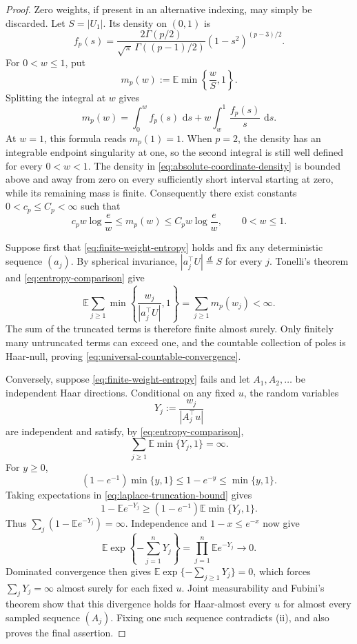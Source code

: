 \documentclass[11pt]{article}
\numberwithin{equation}{section}
\theoremstyle{thmstyleone}%
\theoremstyle{thmstyletwo}%
\let\cref\autoref
\newcommand{\E}{\mathbb E}
\newcommand{\dd}{\,\mathrm d}
\begin{document}
\begin{proof}
Zero weights, if present in an alternative indexing, may simply be
discarded.
Let \(S=|U_1|\).  Its density on \((0,1)\) is
\begin{equation}
  f_p(s)
  =
  \frac{2\Gamma(p/2)}{
    \sqrt\pi\,\Gamma((p-1)/2)}
  (1-s^2)^{(p-3)/2}.
  \label{eq:absolute-coordinate-density}
\end{equation}
For \(0<w\leq1\), put
\[
  m_p(w):=\E\min\left\{\frac{w}{S},1\right\}.
\]
Splitting the integral at \(w\) gives
\begin{equation}
  m_p(w)
  =
  \int_0^w f_p(s)\,\dd s
  +w\int_w^1\frac{f_p(s)}s\,\dd s.
  \label{eq:truncated-reciprocal-moment}
\end{equation}
At \(w=1\), this formula reads \(m_p(1)=1\).  When \(p=2\), the density has
an integrable endpoint singularity at one, so the second integral is still
well defined for every \(0<w<1\).
The density in \cref{eq:absolute-coordinate-density} is bounded above and
away from zero on every sufficiently short interval starting at zero, while
its remaining mass is finite.  Consequently there exist constants
\(0<c_p\leq C_p<\infty\) such that
\begin{equation}
  c_pw\log\frac{e}{w}
  \leq m_p(w)\leq
  C_pw\log\frac{e}{w},
  \qquad 0<w\leq1.
  \label{eq:entropy-comparison}
\end{equation}

Suppose first that \cref{eq:finite-weight-entropy} holds and fix any
deterministic sequence \((a_j)\).  By spherical invariance,
\(|a_j^\top U|\overset{d}{=}S\) for every \(j\).  Tonelli's theorem and
\cref{eq:entropy-comparison} give
\[
  \E\sum_{j\geq1}
  \min\left\{\frac{w_j}{|a_j^\top U|},1\right\}
  =\sum_{j\geq1}m_p(w_j)<\infty.
\]
The sum of the truncated terms is therefore finite almost surely.  Only
finitely many untruncated terms can exceed one, and the countable collection
of poles is Haar-null, proving
\cref{eq:universal-countable-convergence}.

Conversely, suppose \cref{eq:finite-weight-entropy} fails and let
\(A_1,A_2,\ldots\) be independent Haar directions.  Conditional on any
fixed \(u\), the random variables
\[
  Y_j:=\frac{w_j}{|A_j^\top u|}
\]
are independent and satisfy, by \cref{eq:entropy-comparison},
\[
  \sum_{j\geq1}\E\min\{Y_j,1\}=\infty.
\]
For \(y\geq0\),
\begin{equation}
  (1-e^{-1})\min\{y,1\}
  \leq1-e^{-y}\leq\min\{y,1\}.
  \label{eq:laplace-truncation-bound}
\end{equation}
Taking expectations in \cref{eq:laplace-truncation-bound} gives
\[
  1-\E e^{-Y_j}
  \geq(1-e^{-1})\E\min\{Y_j,1\}.
\]
Thus \(\sum_j(1-\E e^{-Y_j})=\infty\).  Independence and
\(1-x\leq e^{-x}\) now give
\[
  \E\exp\left\{-\sum_{j=1}^nY_j\right\}
  =\prod_{j=1}^n\E e^{-Y_j}
  \longrightarrow0.
\]
Dominated convergence then gives
\(\E\exp\{-\sum_{j\geq1}Y_j\}=0\), which forces
\(\sum_jY_j=\infty\) almost surely for each fixed \(u\).  Joint measurability
and Fubini's theorem show that this
divergence holds for Haar-almost every \(u\) for almost every sampled
sequence \((A_j)\).  Fixing one such sequence contradicts \textup{(ii)}, and
also proves the final assertion.
\end{proof}
\end{document}
